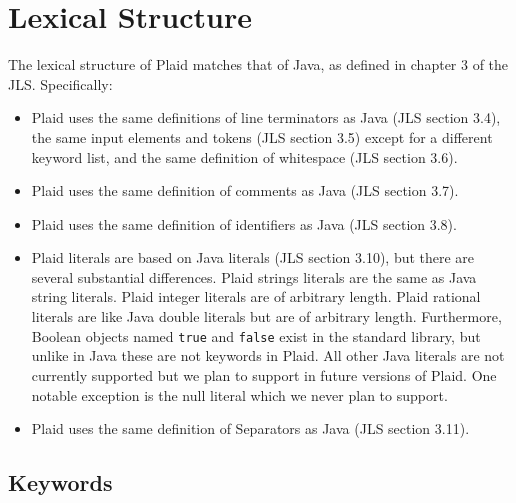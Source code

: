 \section{Lexical Structure}

The lexical structure of Plaid matches that of Java, as defined in
chapter 3 of the JLS.  Specifically:

\begin{itemize}



\item Plaid uses the same definitions of line terminators as Java (JLS
  section 3.4), the same input elements and tokens (JLS section 3.5)
  except for a different keyword list, and the same definition of
  whitespace (JLS section 3.6).

\item Plaid uses the same definition of comments as Java (JLS section 3.7).

\item Plaid uses the same definition of identifiers as Java (JLS section 3.8).

\item Plaid literals are based on Java literals (JLS section
  3.10), but there are several substantial differences. Plaid strings literals are the same as Java string literals. Plaid integer literals are of arbitrary length. Plaid rational literals are like Java double literals but are of arbitrary length. Furthermore, Boolean objects named \texttt{true} and \texttt{false} exist in the standard library, but unlike in Java these are not keywords in Plaid. All other Java literals are not currently supported but we plan to support in future versions of Plaid. One notable exception is the null literal which we never plan to support.

\item Plaid uses the same definition of Separators as Java (JLS section 3.11).

\end{itemize}


\subsection{Keywords}


